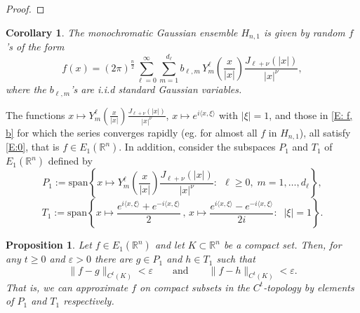 \documentclass[11pt,reqno]{amsart}
\newcommand{\R}{{\mathbb R}}
\newcommand{\ep}{\varepsilon}
\newcommand{\E} {\mathbb E}
\newtheorem{corollary}[theorem]{Corollary}
\newtheorem{proposition}[theorem]{Proposition}
\theoremstyle{definition}
\begin{document}
\begin{proof}
\end{proof} 

\begin{corollary}
The monochromatic Gaussian ensemble $H_{n,1}$ is given by random $f$'s  of the form
\begin{equation*}
{f}(x)=(2\pi)^{\frac{n}{2}} \sum_{\ell=0}^\infty \sum_{m=1}^{d_{\ell}} b_{\ell,m} \,  Y^\ell_m \left(\frac{x}{|x|}\right) \frac{J_{\ell + \nu}(|x|)}{|x|^{\nu}},
\end{equation*}
where the $b_{\ell, m}$'s are i.i.d  standard  Gaussian variables.
\end{corollary}

The functions $x \mapsto Y^\ell_m \left(\frac{x}{|x|}\right) \frac{J_{\ell + \nu}(|x|)}{|x|^{\nu}}$, $x \mapsto e^{i \langle x, \xi\rangle}$ with $|\xi|=1$, and those in \eqref{E: f, b} for which the series converges rapidly (eg. for almost all $f$ in $H_{n,1}$), all satisfy \eqref{E:0}, that is $f \in E_1(\R^n)$.
In addition, consider the subspaces $P_1$ and $T_1$ of $E_1(\R^n)$ defined by
\[P_1:= \text{span}\left\{x \mapsto Y^\ell_m \left(\frac{x}{|x|}\right) \frac{J_{\ell + \nu}(|x|)}{|x|^{\nu}}:\; \, \ell \geq 0, \; m=1, \dots, d_\ell \right\},\] 
\[T_1:= \text{span}\left\{x\mapsto\frac{e^{i \langle x, \xi\rangle} +e^{-i \langle x, \xi\rangle} }{2}\, ,\,x\mapsto \frac{e^{i \langle x, \xi\rangle} -e^{-i \langle x, \xi\rangle} }{2i}:\;\; |\xi|=1 \right\} .\] 

\begin{proposition}\label{E: approximation}
Let  $f \in E_1(\R^n)$ and let $K \subset \R^n$ be a compact set. Then, for any $t \geq 0$ and $\ep>0$ there are $g \in P_1$ and $h \in T_1$ such that 
\[\|f-g\|_{C^t(K)}<\ep \qquad \text{and}\qquad \|f-h\|_{C^t(K)}<\ep.\]
That is, we can approximate $f$ on compact subsets in the $C^t$-topology  by elements of $P_1$ and $T_1$ respectively. 
\end{proposition}
\end{document}
